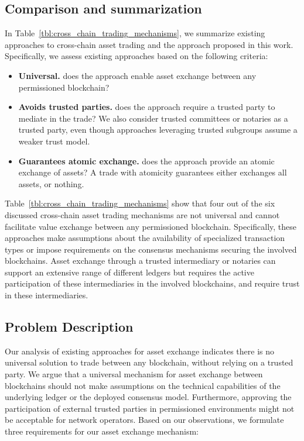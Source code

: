 \subsection{Comparison and summarization}
In Table~\ref{tbl:cross_chain_trading_mechanisms}, we summarize existing approaches to cross-chain asset trading and the approach proposed in this work.
Specifically, we assess existing approaches based on the following criteria:
\begin{itemize}
	\item \textbf{Universal.} does the approach enable asset exchange between any permissioned blockchain?
	\item \textbf{Avoids trusted parties.} does the approach require a trusted party to mediate in the trade? We also consider trusted committees or notaries as a trusted party, even though approaches leveraging trusted subgroups assume a weaker trust model.
	\item \textbf{Guarantees atomic exchange.} does the approach provide an atomic exchange of assets? A trade with atomicity guarantees either exchanges all assets, or nothing.
\end{itemize}

Table~\ref{tbl:cross_chain_trading_mechanisms} show that four out of the six discussed cross-chain asset trading mechanisms are not universal and cannot facilitate value exchange between any permissioned blockchain.
Specifically, these approaches make assumptions about the availability of specialized transaction types or impose requirements on the consensus mechanisms securing the involved blockchains.
Asset exchange through a trusted intermediary or notaries can support an extensive range of different ledgers but requires the active participation of these intermediaries in the involved blockchains, and require trust in these intermediaries.

\subsection{Problem Description}
\label{sec:problem_description}
Our analysis of existing approaches for asset exchange indicates there is no universal solution to trade between any blockchain, without relying on a trusted party.
We argue that a universal mechanism for asset exchange between blockchains should not make assumptions on the technical capabilities of the underlying ledger or the deployed consensus model.
Furthermore, approving the participation of external trusted parties in permissioned environments might not be acceptable for network operators.
Based on our observations, we formulate three requirements for our asset exchange mechanism:

